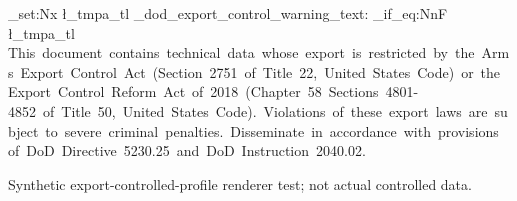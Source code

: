 \documentclass[letterpaper]{article}
\begin{document}
\ExplSyntaxOn
\tl_set:Nx \l_tmpa_tl {\ls_dod_export_control_warning_text:}
\tl_if_eq:NnF \l_tmpa_tl
  {This~document~contains~technical~data~whose~export~is~restricted~by~the~Arms~Export~Control~Act~(Section~2751~of~Title~22,~United~States~Code)~or~the~Export~Control~Reform~Act~of~2018~(Chapter~58~Sections~4801-4852~of~Title~50,~United~States~Code).~Violations~of~these~export~laws~are~subject~to~severe~criminal~penalties.~Disseminate~in~accordance~with~provisions~of~DoD~Directive~5230.25~and~DoD~Instruction~2040.02.}
  {\PackageError{linearspace-test}{DoD~export-warning~wording~regression}{}}
\ExplSyntaxOff
\LSMarkingNotices
Synthetic export-controlled-profile renderer test; not actual controlled data.
\end{document}
